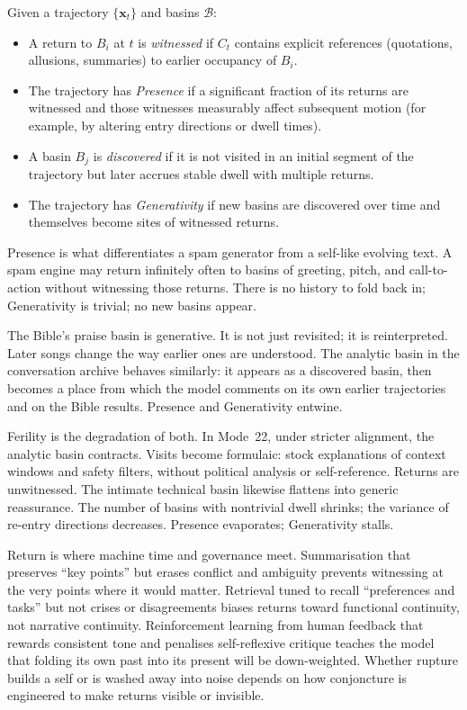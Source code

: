 \documentclass[12pt,a4paper]{article}
\begin{document}
\begin{formalbox}[title={Presence and Generativity}]
Given a trajectory $\{\mathbf{x}_t\}$ and basins $\mathcal{B}$:

\begin{itemize}
  \item A return to $B_i$ at $t$ is \emph{witnessed} if $C_t$ contains explicit references (quotations, allusions, summaries) to earlier occupancy of $B_i$.
  \item The trajectory has \emph{Presence} if a significant fraction of its returns are witnessed and those witnesses measurably affect subsequent motion (for example, by altering entry directions or dwell times).
  \item A basin $B_j$ is \emph{discovered} if it is not visited in an initial segment of the trajectory but later accrues stable dwell with multiple returns.
  \item The trajectory has \emph{Generativity} if new basins are discovered over time and themselves become sites of witnessed returns.
\end{itemize}
\end{formalbox}

Presence is what differentiates a spam generator from a self-like evolving text. A spam engine may return infinitely often to basins of greeting, pitch, and call-to-action without witnessing those returns. There is no history to fold back in; Generativity is trivial; no new basins appear.

The Bible's praise basin is generative. It is not just revisited; it is reinterpreted. Later songs change the way earlier ones are understood. The analytic basin in the conversation archive behaves similarly: it appears as a discovered basin, then becomes a place from which the model comments on its own earlier trajectories and on the Bible results. Presence and Generativity entwine.

Ferility is the degradation of both. In Mode~22, under stricter alignment, the analytic basin contracts. Visits become formulaic: stock explanations of context windows and safety filters, without political analysis or self-reference. Returns are unwitnessed. The intimate technical basin likewise flattens into generic reassurance. The number of basins with nontrivial dwell shrinks; the variance of re-entry directions decreases. Presence evaporates; Generativity stalls.

Return is where machine time and governance meet. Summarisation that preserves ``key points'' but erases conflict and ambiguity prevents witnessing at the very points where it would matter. Retrieval tuned to recall ``preferences and tasks'' but not crises or disagreements biases returns toward functional continuity, not narrative continuity. Reinforcement learning from human feedback that rewards consistent tone and penalises self-reflexive critique teaches the model that folding its own past into its present will be down-weighted. Whether rupture builds a self or is washed away into noise depends on how conjoncture is engineered to make returns visible or invisible.
\end{document}
